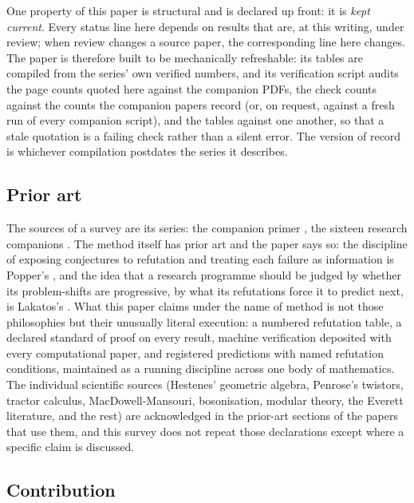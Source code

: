 \documentclass[11pt]{article}
\theoremstyle{definition}
\begin{document}
One property of this paper is structural and is declared up front: it is \emph{kept current}. Every status line here depends on results that are, at this writing, under review; when review changes a source paper, the corresponding line here changes. The paper is therefore built to be mechanically refreshable: its tables are compiled from the series' own verified numbers, and its verification script audits the page counts quoted here against the companion PDFs, the check counts against the counts the companion papers record (or, on request, against a fresh run of every companion script), and the tables against one another, so that a stale quotation is a failing check rather than a silent error. The version of record is whichever compilation postdates the series it describes.

\subsection*{Prior art}

The sources of a survey are its series: the companion primer \cite{ButlerT0}, the sixteen research companions \cite{ButlerT1, ButlerT2, ButlerT3, ButlerT4, ButlerT5, ButlerT6, ButlerT7, ButlerT8, ButlerT9, ButlerT10, ButlerT11, ButlerT12, ButlerT13, ButlerT14, ButlerT15, ButlerT16}. The method itself has prior art and the paper says so: the discipline of exposing conjectures to refutation and treating each failure as information is Popper's \cite{Popper1963}, and the idea that a research programme should be judged by whether its problem-shifts are progressive, by what its refutations force it to predict next, is Lakatos's \cite{Lakatos1978}. What this paper claims under the name of method is not those philosophies but their unusually literal execution: a numbered refutation table, a declared standard of proof on every result, machine verification deposited with every computational paper, and registered predictions with named refutation conditions, maintained as a running discipline across one body of mathematics. The individual scientific sources (Hestenes' geometric algebra, Penrose's twistors, tractor calculus, MacDowell-Mansouri, bosonisation, modular theory, the Everett literature, and the rest) are acknowledged in the prior-art sections of the papers that use them, and this survey does not repeat those declarations except where a specific claim is discussed.

\subsection*{Contribution}
\end{document}
